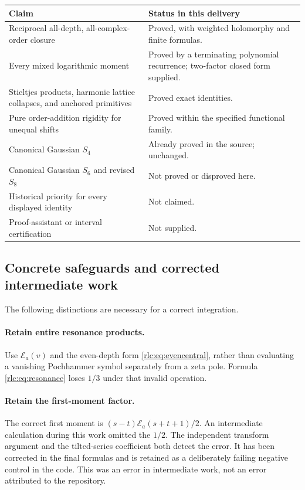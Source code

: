 \documentclass[11pt,a4paper]{article}
\numberwithin{equation}{section}
\theoremstyle{definition}\newtheorem{definition}[theorem]{Definition}
\theoremstyle{remark}\newtheorem{remark}[theorem]{Remark}
\newcommand{\E}{\mathcal E}
\begin{document}
\begin{center}
\begin{tabular}{@{}p{}p{}@{}}
\toprule
Claim & Status in this delivery\\
\midrule
Reciprocal all-depth, all-complex-order closure & Proved, with weighted
holomorphy and finite formulas.\\[3pt]
Every mixed logarithmic moment & Proved by a terminating polynomial
recurrence; two-factor closed form supplied.\\[3pt]
Stieltjes products, harmonic lattice collapses, and anchored primitives
& Proved exact identities.\\[3pt]
Pure order-addition rigidity for unequal shifts & Proved within the
specified functional family.\\[3pt]
Canonical Gaussian $S_4$ & Already proved in the source; unchanged.\\[3pt]
Canonical Gaussian $S_6$ and revised $S_8$ & Not proved or disproved here.\\[3pt]
Historical priority for every displayed identity & Not claimed.\\[3pt]
Proof-assistant or interval certification & Not supplied.\\
\bottomrule
\end{tabular}
\end{center}

\subsection{Concrete safeguards and corrected intermediate work}
The following distinctions are necessary for a correct integration.

\paragraph{Retain entire resonance products.}
Use $\E_a(v)$ and the even-depth form
\eqref{rlc:eq:evencentral}, rather than evaluating a vanishing
Pochhammer symbol separately from a zeta pole. Formula
\eqref{rlc:eq:resonance} loses $1/3$ under that invalid operation.

\paragraph{Retain the first-moment factor.}
The correct first moment is $(s-t)\E_a(s+t+1)/2$.
An intermediate calculation during this work omitted the $1/2$.
The independent transform argument and the tilted-series coefficient
both detect the error. It has been corrected in the final formulas and
is retained as a deliberately failing negative control in the code.
This was an error in intermediate work, not an error attributed to the
repository.
\end{document}
